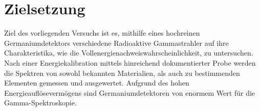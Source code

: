 \section{Zielsetzung}\label{sec:zielsetzung}
Ziel des vorliegenden Versuchs ist es, mithilfe eines hochreinen Germaniumdetektors verschiedene Radioaktive Gammastrahler auf ihre Charakteristika, wie die Vollenergienachweiswahrscheinlichkeit, zu untersuchen.
Nach einer Energiekalibration mittels hinreichend dokumentierter Probe werden die Spektren von sowohl bekannten Materialien, als auch zu bestimmenden Elementen gemessen und ausgewertet.
Aufgrund des hohen Energieauflösevermögens sind Germaniumdetektoren von enormem Wert für die Gamma-Spektroskopie.